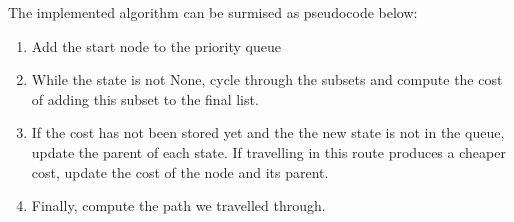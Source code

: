 The implemented algorithm can be surmised as pseudocode below:

\begin{enumerate}
  \item Add the start node to the priority queue
  \item While the state is not None, cycle through the subsets and compute the cost of adding this subset to the final list.
  \item If the cost has not been stored yet and the the new state is not in the queue, update the parent of each state. If travelling in this route produces a cheaper cost, update the cost of the node and its parent.
  \item Finally, compute the path we travelled through.
\end{enumerate}



